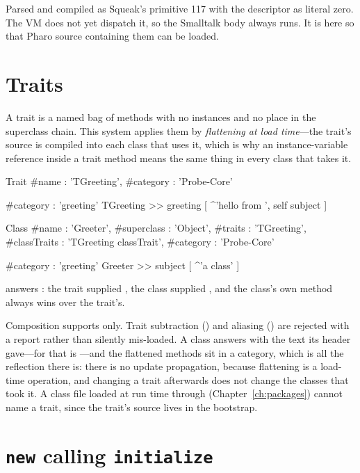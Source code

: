 Parsed and compiled as Squeak's primitive 117 with the descriptor as literal
zero. The VM does not yet dispatch it, so the Smalltalk body always runs. It
is here so that Pharo source containing them can be loaded.

\section{Traits}

A trait is a named bag of methods with no instances and no place in the
superclass chain. This system applies them by \emph{flattening at load
time}---the trait's source is compiled into each class that uses it, which is
why an instance-variable reference inside a trait method means the same thing
in every class that takes it.

\begin{st}
Trait {
	#name : 'TGreeting',
	#category : 'Probe-Core'
}

{ #category : 'greeting' }
TGreeting >> greeting [
	^'hello from ', self subject
]
\end{st}

\begin{st}
Class {
	#name : 'Greeter',
	#superclass : 'Object',
	#traits : 'TGreeting',
	#classTraits : 'TGreeting classTrait',
	#category : 'Probe-Core'
}

{ #category : 'greeting' }
Greeter >> subject [
	^'a class'
]
\end{st}

 answers : the trait supplied
, the class supplied , and the class's own method
always wins over the trait's.

Composition supports \ct{+} only. Trait subtraction (\ct{-}) and aliasing
() are rejected with a report rather than silently mis-loaded. A class
answers  with the text its header gave---for
 that is ---and the flattened methods sit in a
 category, which is all the reflection there is: there
is no update propagation, because flattening is a load-time operation, and
changing a trait afterwards does not change the classes that took it. A
class file loaded at run time through  (Chapter~\ref{ch:packages})
cannot name a trait, since the trait's source lives in the bootstrap.

\section{\texttt{new} calling \texttt{initialize}}

